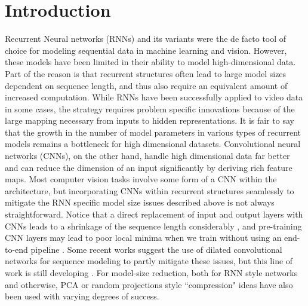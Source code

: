 \section{Introduction}\label{sec:intro}

Recurrent Neural networks (RNNs) and its variants were the de facto 
tool of choice 
for modeling sequential data in machine learning and vision.
However, these models have been limited in their ability to model high-dimensional data.
Part of the reason is that recurrent structures often lead to large model sizes dependent on sequence length, and thus also require an equivalent amount of increased computation.
While RNNs have been successfully applied to video data in some cases, the strategy 
requires problem specific innovations because of the large mapping necessary 
from inputs to hidden representations. It is fair to say that the growth 
in the number of model parameters in various types of 
recurrent models remains a bottleneck for high 
dimensional datasets. 
%
Convolutional neural networks (CNNs), on the other hand, 
handle high dimensional data
far better and 
can reduce the dimension of an input significantly by deriving rich feature maps. Most computer vision tasks involve some form of a CNN within the architecture, but incorporating CNNs within recurrent structures 
seamlessly to mitigate the RNN specific model size issues described above is not always straightforward.
Notice that a direct replacement of input and output layers with CNNs
leads to a shrinkage of the sequence length considerably \citep{srivastava2015unsupervised},
and pre-training CNN layers may lead to poor local minima
when we train without using an end-to-end pipeline \citep{donahue2015long}.
Some recent works suggest the use of dilated convolutional networks 
for sequence modeling \citep{yu2015multi} to partly mitigate these issues, but this line of work is still developing \citep{zhenIccv2019}. 
For model-size reduction, both for RNN style networks and otherwise, 
PCA or random projections \citep{ye2005two,bingham2001random} style ``compression" ideas have 
also been used with varying degrees of success.

